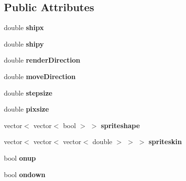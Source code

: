 \subsection*{Public Attributes}
\begin{DoxyCompactItemize}
\item 
\hypertarget{classGoodguy_a3b3f46166e8f91ed336f4b60614bd048}{double {\bfseries shipx}}\label{classGoodguy_a3b3f46166e8f91ed336f4b60614bd048}

\item 
\hypertarget{classGoodguy_ae51a2d220d2a4dfc14e3826ddbcf6bd1}{double {\bfseries shipy}}\label{classGoodguy_ae51a2d220d2a4dfc14e3826ddbcf6bd1}

\item 
\hypertarget{classGoodguy_aa637292451536f085e202184af396037}{double {\bfseries render\-Direction}}\label{classGoodguy_aa637292451536f085e202184af396037}

\item 
\hypertarget{classGoodguy_a46f3b60e1452983e1fc1a5637ec6b7a9}{double {\bfseries move\-Direction}}\label{classGoodguy_a46f3b60e1452983e1fc1a5637ec6b7a9}

\item 
\hypertarget{classGoodguy_a4db6d19abfbf8f2fd15cb5bbf5994246}{double {\bfseries stepsize}}\label{classGoodguy_a4db6d19abfbf8f2fd15cb5bbf5994246}

\item 
\hypertarget{classGoodguy_a29b85c34a7ece706fc0b9f279abacb27}{double {\bfseries pixsize}}\label{classGoodguy_a29b85c34a7ece706fc0b9f279abacb27}

\item 
\hypertarget{classGoodguy_a6f6e1ab72e3de5f26bf4dcbb2eb93bbb}{vector$<$ vector$<$ bool $>$ $>$ {\bfseries spriteshape}}\label{classGoodguy_a6f6e1ab72e3de5f26bf4dcbb2eb93bbb}

\item 
\hypertarget{classGoodguy_af2b252653ccdf333d0c8cc74ebf31f2a}{vector$<$ vector$<$ vector$<$ double $>$ $>$ $>$ {\bfseries spriteskin}}\label{classGoodguy_af2b252653ccdf333d0c8cc74ebf31f2a}

\item 
\hypertarget{classGoodguy_a6794c1b5241328c9a97f53a7d21bc80d}{bool {\bfseries onup}}\label{classGoodguy_a6794c1b5241328c9a97f53a7d21bc80d}

\item 
\hypertarget{classGoodguy_a67f8ca5281849da6ef75f9e90f3a2237}{bool {\bfseries ondown}}\label{classGoodguy_a67f8ca5281849da6ef75f9e90f3a2237}


\end{DoxyCompactItemize}
